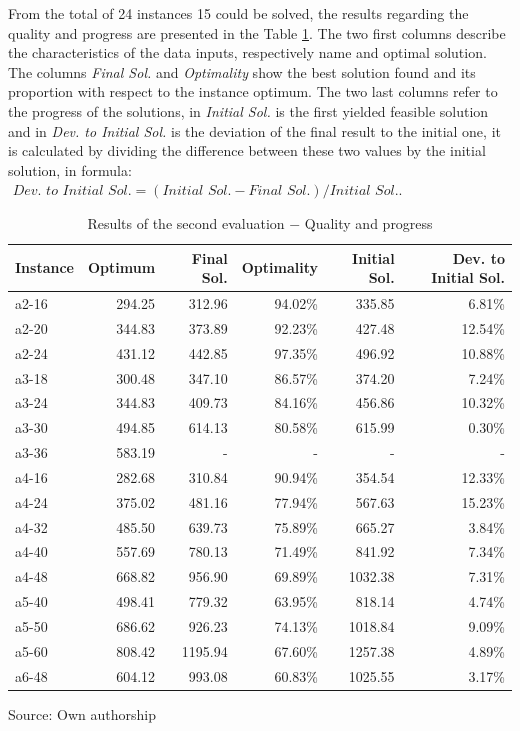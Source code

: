 \documentclass[tuberlin,cic,tc,openright,english,noabntcite,oneside]{iiufrgs}
\begin{document}
From the total of 24 instances 15 could be solved, the results regarding the quality and progress are presented in the Table \ref{tab:evaluation-2.1}. The two first columns describe the characteristics of the data inputs, respectively name and optimal solution. The columns \emph{Final Sol.} and \emph{Optimality} show the best solution found and its proportion with respect to the instance optimum. The two last columns refer to the progress of the solutions, in \emph{Initial Sol.} is the first yielded feasible solution and in \emph{Dev. to Initial Sol.} is the deviation of the final result to the initial one, it is calculated by dividing the difference between these two values by the initial solution, in formula: $\textit{ Dev. to Initial Sol.} = (\textit{Initial Sol.} - \textit{Final Sol.}) / \textit{Initial Sol.}$.
\begin{table}[H]
\centering
\caption{Results of the second evaluation $-$ Quality and progress}
\begin{tabular}{l | r | r | r | r | r}
\hline
Instance & Optimum & Final Sol. & Optimality & Initial Sol. & Dev. to Initial Sol.\\
\hline
a2-16 & 	294.25 & 	312.96 & 	94.02\% & 	335.85 & 	6.81\% \\
a2-20 & 	344.83 & 	373.89 & 	92.23\% & 	427.48 & 	12.54\% \\
a2-24 & 	431.12 & 	442.85 & 	97.35\% & 	496.92 & 	10.88\% \\
a3-18 & 	300.48 & 	347.10 & 	86.57\% & 	374.20 & 	7.24\% \\
a3-24 & 	344.83 & 	409.73 & 	84.16\% & 	456.86 & 	10.32\% \\
a3-30 & 	494.85 & 	614.13 & 	80.58\% & 	615.99 & 	0.30\% \\
a3-36 & 	583.19 & 	- & 	- & 	- & 	- \\
a4-16 & 	282.68 & 	310.84 & 	90.94\% & 	354.54 & 	12.33\% \\
a4-24 & 	375.02 & 	481.16 & 	77.94\% & 	567.63 & 	15.23\% \\
a4-32 & 	485.50 & 	639.73 & 	75.89\% & 	665.27 & 	3.84\% \\
a4-40 & 	557.69 & 	780.13 & 	71.49\% & 	841.92 & 	7.34\% \\
a4-48 & 	668.82 & 	956.90 & 	69.89\% & 	1032.38 & 	7.31\% \\
a5-40 & 	498.41 & 	779.32 & 	63.95\% & 	818.14 & 	4.74\% \\
a5-50 & 	686.62 & 	926.23 & 	74.13\% & 	1018.84 & 	9.09\% \\
a5-60 & 	808.42 & 	1195.94 & 	67.60\% & 	1257.38 & 	4.89\% \\
a6-48 & 	604.12 & 	993.08 & 	60.83\% & 	1025.55 & 	3.17\% \\
\hline
\end{tabular}
\center Source: Own authorship
\label{tab:evaluation-2.1}
\end{table}
\end{document}
